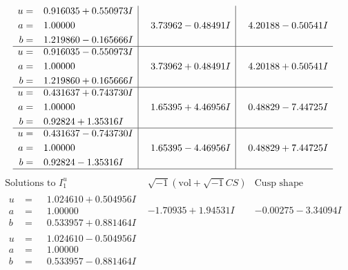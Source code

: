 \documentclass[1p]{elsarticle_modified}
\theoremstyle{definition}
\newcommand{\I}{\sqrt{-1}}
\begin{document}
$$\begin{array}{c|c|c}
\begin{aligned}
u &= \phantom{-}0.916035 + 0.550973 I \\
a &= \phantom{-}1.00000\phantom{ +0.000000I} \\
b &= \phantom{-}1.219860 - 0.165666 I\end{aligned}
 & \phantom{-}3.73962 - 0.48491 I & \phantom{-}4.20188 - 0.50541 I \\ \hline\begin{aligned}
u &= \phantom{-}0.916035 - 0.550973 I \\
a &= \phantom{-}1.00000\phantom{ +0.000000I} \\
b &= \phantom{-}1.219860 + 0.165666 I\end{aligned}
 & \phantom{-}3.73962 + 0.48491 I & \phantom{-}4.20188 + 0.50541 I \\ \hline\begin{aligned}
u &= \phantom{-}0.431637 + 0.743730 I \\
a &= \phantom{-}1.00000\phantom{ +0.000000I} \\
b &= \phantom{-}0.92824 + 1.35316 I\end{aligned}
 & \phantom{-}1.65395 + 4.46956 I & \phantom{-}0.48829 - 7.44725 I \\ \hline\begin{aligned}
u &= \phantom{-}0.431637 - 0.743730 I \\
a &= \phantom{-}1.00000\phantom{ +0.000000I} \\
b &= \phantom{-}0.92824 - 1.35316 I\end{aligned}
 & \phantom{-}1.65395 - 4.46956 I & \phantom{-}0.48829 + 7.44725 I\\
 \hline 
 \end{array}$$\newpage$$\begin{array}{c|c|c}  
\text{Solutions to }I^u_{1}& \I (\text{vol} + \sqrt{-1}CS) & \text{Cusp shape}\\
 \hline 
\begin{aligned}
u &= \phantom{-}1.024610 + 0.504956 I \\
a &= \phantom{-}1.00000\phantom{ +0.000000I} \\
b &= \phantom{-}0.533957 + 0.881464 I\end{aligned}
 & -1.70935 + 1.94531 I & -0.00275 - 3.34094 I \\ \hline\begin{aligned}
u &= \phantom{-}1.024610 - 0.504956 I \\
a &= \phantom{-}1.00000\phantom{ +0.000000I} \\
b &= \phantom{-}0.533957 - 0.881464 I\end{aligned}

\end{array}$$
\end{document}
